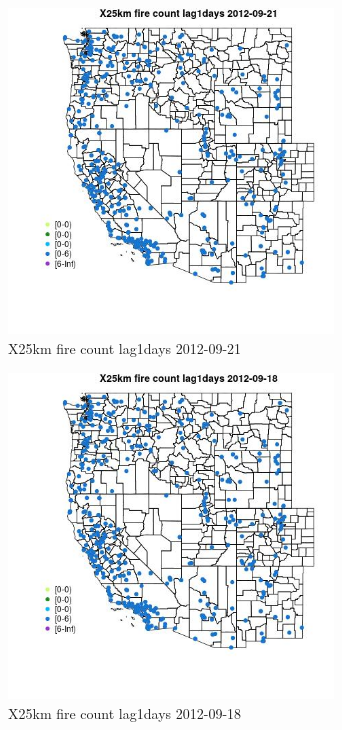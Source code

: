 \begin{figure} 
\centering  
\includegraphics[width=0.77\textwidth]{Code_Outputs/Report_ML_input_PM25_Step4_part_e_de_duplicated_aves_compiled_2019-05-14wNAs_MapObsX25km_fire_count_lag1days2012-09-21.jpg} 
\caption{\label{fig:Report_ML_input_PM25_Step4_part_e_de_duplicated_aves_compiled_2019-05-14wNAsMapObsX25km_fire_count_lag1days2012-09-21}X25km fire count lag1days 2012-09-21} 
\end{figure} 
 

\begin{figure} 
\centering  
\includegraphics[width=0.77\textwidth]{Code_Outputs/Report_ML_input_PM25_Step4_part_e_de_duplicated_aves_compiled_2019-05-14wNAs_MapObsX25km_fire_count_lag1days2012-09-18.jpg} 
\caption{\label{fig:Report_ML_input_PM25_Step4_part_e_de_duplicated_aves_compiled_2019-05-14wNAsMapObsX25km_fire_count_lag1days2012-09-18}X25km fire count lag1days 2012-09-18} 
\end{figure} 
 

